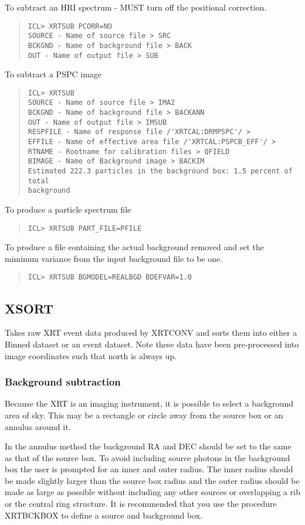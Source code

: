 \documentclass{book}
\renewcommand{\_}{{\tt\char'137}}     %
\begin{document}
To subtract an HRI spectrum - MUST turn off the positional correction.
\begin{quote}\begin{verbatim}
ICL> XRTSUB PCORR=NO
SOURCE - Name of source file > SRC
BCKGND - Name of background file > BACK
OUT - Name of output file > SUB
\end{verbatim}\end{quote}
To subtract a PSPC image
\begin{quote}\begin{verbatim}
ICL> XRTSUB
SOURCE - Name of source file > IMA2
BCKGND - Name of background file > BACKANN
OUT - Name of output file > IMSUB
RESPFILE - Name of response file /'XRTCAL:DRMPSPC'/ >
EFFILE - Name of effective area file /'XRTCAL:PSPCB_EFF'/ >
RTNAME - Rootname for calibration files > QFIELD
BIMAGE - Name of Background image > BACKIM
Estimated 222.3 particles in the background box: 1.5 percent of total
background
\end{verbatim}\end{quote}
To produce a particle spectrum file
\begin{quote}\begin{verbatim}
ICL> XRTSUB PART_FILE=PFILE
\end{verbatim}\end{quote}
To produce a file containing the actual background removed and
set the miminum variance from the input background file to be
one.
\begin{quote}\begin{verbatim}
ICL> XRTSUB BGMODEL=REALBGD BDEFVAR=1.0
\end{verbatim}\end{quote}
\subsection{XSORT}
Takes raw XRT event data produced by XRTCONV and sorts them into either
a Binned dataset or an event dataset.
Note these data have been pre-processed into image coordinates
such that north is always up.
 
\subsubsection{Background subtraction}
Because the XRT is an imaging instrument, it is possible to select
a background area of sky. This may be a rectangle or circle away from
the source box or an annulus around it.
 
In the annulus method the background RA and DEC should be set to
the same as that of the source box. To avoid including source photons
in the background box the user is prompted for an inner and outer
radius. The inner radius should be made slightly larger than the
source box radius and the outer radius should be made as large as
possible without including any other sources or overlapping a rib
or the central ring structure. It is recommended that you use the
procedure XRTBCKBOX to define a source and background box.
 
\end{document}
